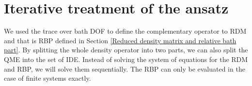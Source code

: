 \section{Iterative treatment of the ansatz}
\label{Iterative treatment of ansatz}

We used the trace over bath DOF to define the complementary operator to RDM and that is RBP defined in Section \ref{Reduced density matrix and relative bath part}. By splitting the whole density operator into two parts, we can also split the QME into the set of IDE. Instead of solving the system of equations for the RDM and RBP, we will solve them sequentially. The RBP can only be evaluated in the case of finite systems exactly.

